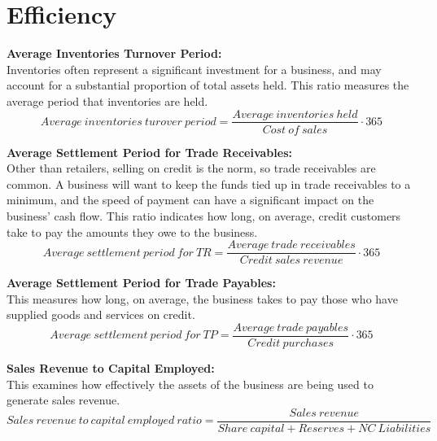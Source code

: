 \documentclass{report}
\newenvironment{blackbox}[1][Black]
  {\begin{tcolorbox}[colframe=#1,colback=white]}
  {\end{tcolorbox}}
\begin{document}
\section{Efficiency}

\begin{blackbox}
    \textbf{Average Inventories Turnover Period:}\\
    Inventories often represent a significant investment for a business, and may account for a substantial proportion of total assets held. This ratio measures the average period that inventories are held.
    \begin{equation}
        Average \: inventories \: turover \: period = \frac{Average \: inventories \: held}{Cost \: of \: sales} \cdot 365
    \end{equation}
\end{blackbox}

\begin{blackbox}
    \textbf{Average Settlement Period for Trade Receivables:}\\
    Other than retailers, selling on credit is the norm, so trade receivables are common. A business will want to keep the funds tied up in trade receivables to a minimum, and the speed of payment can have a significant impact on the business' cash flow. This ratio indicates how long, on average, credit customers take to pay the amounts they owe to the business.
    \begin{equation}
        Average \: settlement \: period \: for \: TR = \frac{Average \: trade \: receivables}{Credit \: sales \: revenue} \cdot 365
    \end{equation}
\end{blackbox}

\begin{blackbox}
    \textbf{Average Settlement Period for Trade Payables:}\\
    This measures how long, on average, the business takes to pay those who have supplied goods and services on credit.
    \begin{equation}
        Average \: settlement \: period \: for \: TP = \frac{Average \: trade \: payables}{Credit \: purchases} \cdot 365
    \end{equation}
\end{blackbox}

\begin{blackbox}
    \textbf{Sales Revenue to Capital Employed:}\\
    This examines how effectively the assets of the business are being used to generate sales revenue.
    \begin{equation}
        Sales \: revenue \: to \: capital \:employed \: ratio = \frac{Sales \: revenue}{Share \: capital + Reserves + NC \: Liabilities}
    \end{equation}
\end{blackbox}
\end{document}
